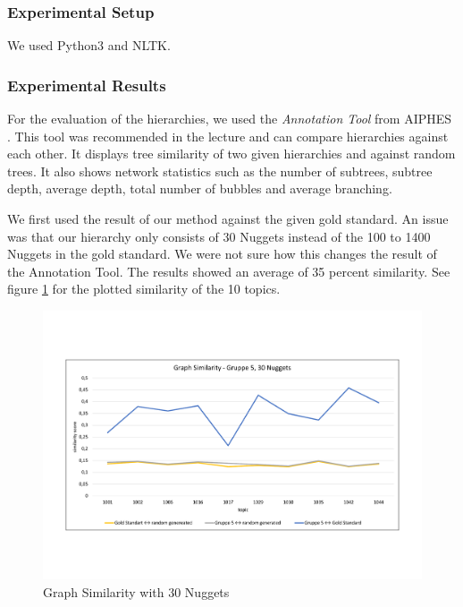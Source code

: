 \subsubsection{Experimental Setup}

We used Python3 and NLTK.

\subsubsection{Experimental Results}


For the evaluation of the hierarchies, we used the \textit{Annotation Tool} from AIPHES \citep{Tauchmann.et.al.2018.LREC}. This tool was recommended in the lecture and can compare hierarchies against each other. It displays tree similarity of two given hierarchies and against random trees. It also shows network statistics such as the number of subtrees, subtree depth, average depth, total number of bubbles and average branching.

We first used the result of our method against the given gold standard. An issue was that our hierarchy only consists of 30 Nuggets instead of the 100 to 1400 Nuggets in the gold standard. We were not sure how this changes the result of the Annotation Tool. The results showed an average of 35 percent similarity. See figure \ref{fig:graph30} for the plotted similarity of the 10 topics.

\begin{figure}[H]
	\centering
	\includegraphics[trim= 0 130 0 130,width=\textwidth]{img/sim_v1.pdf}
	\caption{Graph Similarity with 30 Nuggets}
	\label{fig:graph30}
\end{figure}

